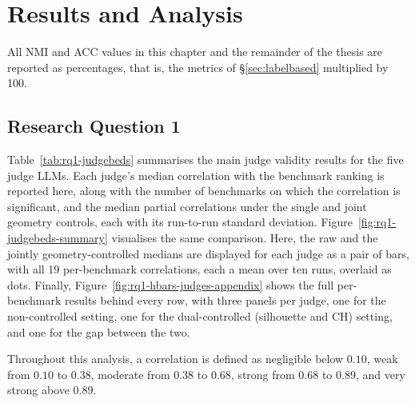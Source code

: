 \documentclass[11pt,a4paper,oneside]{report}
\begin{document}
\FloatBarrier
\chapter{Results and Analysis}

All NMI and ACC values in this chapter and the remainder of the thesis are reported as percentages, that is, the metrics of \S\ref{sec:labelbased} multiplied by 100. 

\section{Research Question 1}\label{sec:results-rq1}

Table~\ref{tab:rq1-judgebeds} summarises the main judge validity results for the five judge LLMs. Each judge's median correlation with the benchmark ranking is reported here, along with the number of benchmarks on which the correlation is significant, and the median partial correlations under the single and joint geometry controls, each with its run-to-run standard deviation. Figure~\ref{fig:rq1-judgebeds-summary} visualises the same comparison. Here, the raw and the jointly geometry-controlled medians are displayed for each judge as a pair of bars, with all 19 per-benchmark correlations, each a mean over ten runs, overlaid as dots. Finally, Figure~\ref{fig:rq1-hbars-judges-appendix} shows the full per-benchmark results behind every row, with three panels per judge, one for the non-controlled setting, one for the dual-controlled (silhouette and CH) setting, and one for the gap between the two.

Throughout this analysis, a correlation is defined as negligible below $0.10$, weak from $0.10$ to $0.38$, moderate from $0.38$ to $0.68$, strong from $0.68$ to $0.89$, and very strong above $0.89$.
\end{document}
